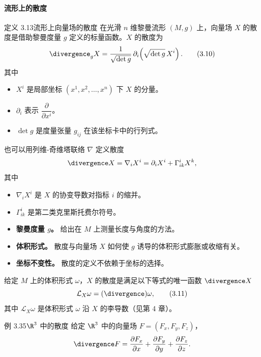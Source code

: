 \paragraph{流形上的散度}
\begin{statement}{定义 3.13}{流形上向量场的散度}
在光滑 $n$ 维黎曼流形 $(M,g)$ 上，向量场 $X$ 的散度是借助黎曼度量 $g$ 定义的标量函数。$X$ 的散度为
\begin{equation*}
  \divergence_g X=\frac{1}{\sqrt{\det g}}\,
      \partial_i\!\left(\sqrt{\det g}\,X^i\right).
  \tag{3.10}\label{eq:3.10}
\end{equation*}
其中
\begin{itemize}
\item $X^i$ 是局部坐标 $(x^1,x^2,\dots,x^n)$ 下 $X$ 的分量。
\item $\partial_i$ 表示 $\dfrac{\partial}{\partial x^i}$。
\item $\det g$ 是度量张量 $g_{ij}$ 在该坐标卡中的行列式。
\end{itemize}
也可以用列维-奇维塔联络 $\nabla$ 定义散度
\[
  \divergence X=\nabla_iX^i=\partial_iX^i+\Gamma^i_{ik}X^k,
\]
其中
\begin{itemize}
\item $\nabla_iX^i$ 是 $X$ 的协变导数对指标 $i$ 的缩并。
\item $\Gamma^i_{ik}$ 是第二类克里斯托费尔符号。
\end{itemize}
\end{statement}

\begin{itemize}
\item \textbf{黎曼度量 $g$。} 给出在 $M$ 上测量长度与角度的方法。
\item \textbf{体积形式。} 散度与向量场 $X$ 如何使 $g$ 诱导的体积形式膨胀或收缩有关。
\item \textbf{坐标不变性。} 散度的定义不依赖于坐标的选择。
\end{itemize}

给定 $M$ 上的体积形式 $\omega$，$X$ 的散度是满足以下等式的唯一函数 $\divergence X$
\begin{equation*}
  \mathcal L_X\omega=(\divergence)\omega,
  \tag{3.11}\label{eq:3.11}
\end{equation*}
其中 $\mathcal L_X\omega$ 是体积形式 $\omega$ 沿 $X$ 的李导数（见第 4 章）。

\begin{statement}{例 3.35}{$\R^3$ 中的散度}
给定 $\R^3$ 中的向量场 $F=(F_x,F_y,F_z)$，
\[
  \divergence F=\frac{\partial F_x}{\partial x}+\frac{\partial F_y}{\partial y}
  +\frac{\partial F_z}{\partial z}.
\]
\end{statement}

